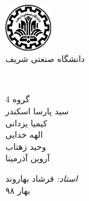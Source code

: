 \begin{titlepage}

	\begin{center}
		
		\includegraphics[width=2cm]{images/tuoslogo.png}
		\\
		{ دانشگاه صنعتی شریف  }
		\\[6cm]
		
		\\[4cm]
		\linespread{1}
		
		{\Large گروه 4 }
		\\[0.4cm]
		{\small سید پارسا اسکندر
			\\[0.2cm] کیمیا یزدانی
			\\[0.2cm] الهه خدایی 
			\\[0.2cm] وحید زهتاب 
			\\[0.2cm] آروین آذرمینا
			\\[0.5cm]
		}
	
		{\large
			\emph{استاد: }
			فرشاد بهاروند
		}
		\\[4cm]
		
		
		{\large بهار ۹۸ }
	\end{center}
	
\end{titlepage}